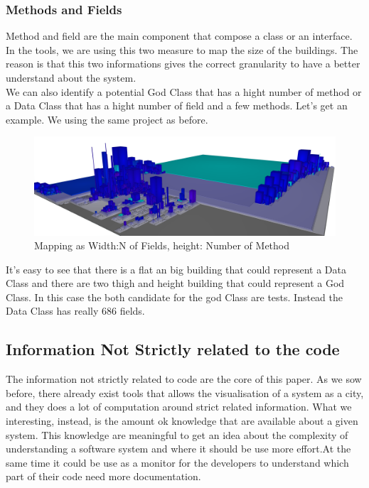 \documentclass[]{usiinfbachelorproject}
\begin{document}
\subsubsection{Methods  and Fields}
Method and field are the main component that compose a class or an interface. In the tools, we are using this two measure to map  the size of the buildings. The reason is that this two informations gives the correct granularity to have a better understand about the system.\\
We can also identify a potential God Class that has a hight number of method  or a Data Class that has a hight number of field and a few  methods.
Let's get an example. We using the same project as before.
\begin{figure}[h]
	\centering
	\includegraphics[width=1\textwidth]{images/fieldAndMethod}
	\caption[Fields and Methods Mapping]{Mapping as Width:N of Fields, height: Number of Method \label{fig:fieldAndMethods}}




	

\end{figure}

It's easy to see that there is a  flat an big building that could represent a Data Class and  there are two thigh and height building that could represent a God Class. In this case the both candidate for the god Class are tests. Instead the Data Class has really  686 fields.




    
\newpage
\subsection{Information Not Strictly related to the code}
The information not strictly related to  code are the core of this paper. As we sow before, there already exist tools that allows the visualisation of a system as a city, and they does a lot of computation around strict related information. What we interesting, instead, is the amount ok knowledge that are available about a given system. This knowledge are meaningful to get an idea about the complexity of understanding a software system and where it should be use more effort.At the same time it  could  be use as a monitor for the developers to understand which part of their code need more documentation.  
\end{document}
